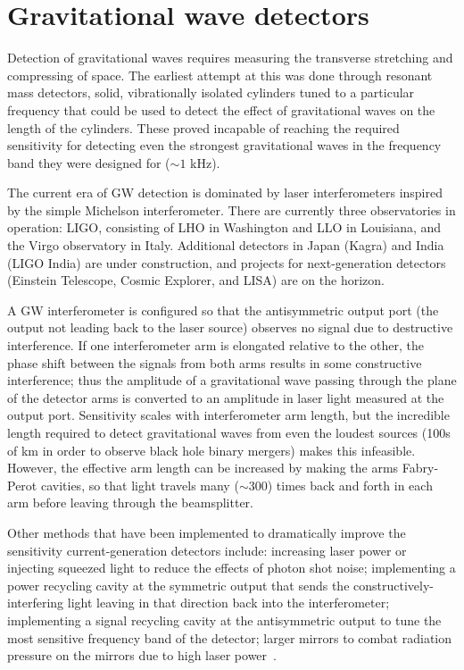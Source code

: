 \chapter{Gravitational wave detectors}\label{ch:detectors}

Detection of gravitational waves requires measuring the transverse stretching and compressing of space. The earliest attempt at this was done through resonant mass detectors, solid, vibrationally isolated cylinders tuned to a particular frequency that could be used to detect the effect of gravitational waves on the length of the cylinders. These proved incapable of reaching the required sensitivity for detecting even the strongest gravitational waves in the frequency band they were designed for ($\sim1$ kHz).

The current era of \ac{GW} detection is dominated by laser interferometers inspired by the simple Michelson interferometer. There are currently three observatories in operation: \ac{LIGO}, consisting of \ac{LHO} in Washington and \ac{LLO} in Louisiana, and the Virgo observatory in Italy. Additional detectors in Japan (Kagra) and India (\ac{LIGO} India) are under construction, and projects for next-generation detectors (Einstein Telescope, Cosmic Explorer, and \ac{LISA}) are on the horizon.

A \ac{GW} interferometer is configured so that the antisymmetric output port (the output not leading back to the laser source) observes no signal due to destructive interference. If one interferometer arm is elongated relative to the other, the phase shift between the signals from both arms results in some constructive interference; thus the amplitude of a gravitational wave passing through the plane of the detector arms is converted to an amplitude in laser light measured at the output port. Sensitivity scales with interferometer arm length, but the incredible length required to detect gravitational waves from even the loudest sources (100s of km in order to observe black hole binary mergers) makes this infeasible. However, the effective arm length can be increased by making the arms Fabry-Perot cavities, so that light travels many ($\sim300$) times back and forth in each arm before leaving through the beamsplitter.

Other methods that have been implemented to dramatically improve the sensitivity current-generation detectors include: increasing laser power or injecting squeezed light to reduce the effects of photon shot noise; implementing a power recycling cavity at the symmetric output that sends the constructively-interfering light leaving in that direction back into the interferometer; implementing a signal recycling cavity at the antisymmetric output to tune the most sensitive frequency band of the detector; larger mirrors to combat radiation pressure on the mirrors due to high laser power~\citep{Creighton_2011}.

